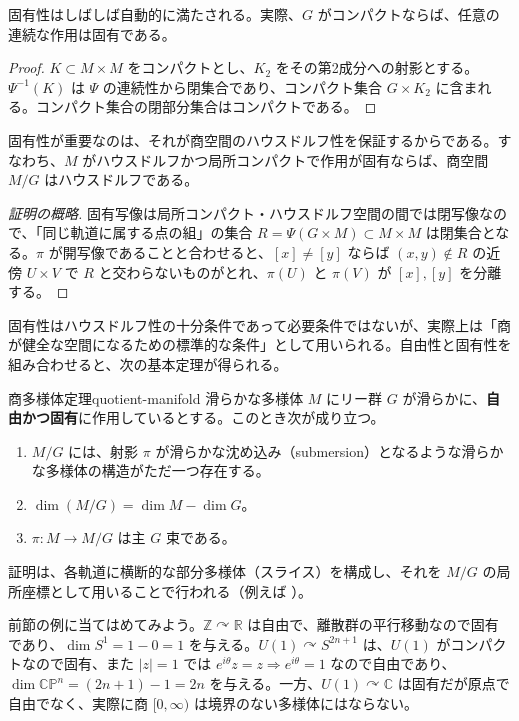 \documentclass[uplatex, dvipdfmx, book]{jsbook}
\begin{document}
固有性はしばしば自動的に満たされる。実際、$G$ がコンパクトならば、任意の連続な作用は固有である。
\begin{proof}
$K \subset M \times M$ をコンパクトとし、$K_2$ をその第2成分への射影とする。$\Psi^{-1}(K)$ は $\Psi$ の連続性から閉集合であり、コンパクト集合 $G \times K_2$ に含まれる。コンパクト集合の閉部分集合はコンパクトである。
\end{proof}

固有性が重要なのは、それが商空間のハウスドルフ性を保証するからである。すなわち、$M$ がハウスドルフかつ局所コンパクトで作用が固有ならば、商空間 $M/G$ はハウスドルフである。
\begin{proof}[証明の概略]
固有写像は局所コンパクト・ハウスドルフ空間の間では閉写像なので、「同じ軌道に属する点の組」の集合 $R = \Psi(G \times M) \subset M \times M$ は閉集合となる。$\pi$ が開写像であることと合わせると、$[x] \neq [y]$ ならば $(x, y) \notin R$ の近傍 $U \times V$ で $R$ と交わらないものがとれ、$\pi(U)$ と $\pi(V)$ が $[x], [y]$ を分離する。
\end{proof}

固有性はハウスドルフ性の十分条件であって必要条件ではないが、実際上は「商が健全な空間になるための標準的な条件」として用いられる。自由性と固有性を組み合わせると、次の基本定理が得られる。

\begin{mythm}{商多様体定理}{quotient-manifold}
滑らかな多様体 $M$ にリー群 $G$ が滑らかに、\textbf{自由かつ固有}に作用しているとする。このとき次が成り立つ。
\begin{enumerate}
    \item $M/G$ には、射影 $\pi$ が滑らかな沈め込み（submersion）となるような滑らかな多様体の構造がただ一つ存在する。
    \item $\dim (M/G) = \dim M - \dim G$。
    \item $\pi: M \to M/G$ は主 $G$ 束である。
\end{enumerate}
\end{mythm}

証明は、各軌道に横断的な部分多様体（スライス）を構成し、それを $M/G$ の局所座標として用いることで行われる（例えば \cite[Thm.~21.10]{lee2013}）。

前節の例に当てはめてみよう。$\mathbb{Z} \curvearrowright \mathbb{R}$ は自由で、離散群の平行移動なので固有であり、$\dim S^1 = 1 - 0 = 1$ を与える。$U(1) \curvearrowright S^{2n+1}$ は、$U(1)$ がコンパクトなので固有、また $|z| = 1$ では $e^{i\theta}z = z \Rightarrow e^{i\theta} = 1$ なので自由であり、$\dim \mathbb{CP}^n = (2n+1) - 1 = 2n$ を与える。一方、$U(1) \curvearrowright \mathbb{C}$ は固有だが原点で自由でなく、実際に商 $[0, \infty)$ は境界のない多様体にはならない。
\end{document}
